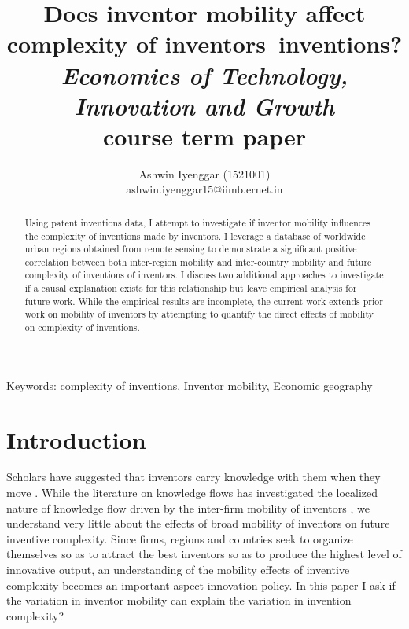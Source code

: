 \documentclass[12pt]{article}
\begin{document}
\title{\LARGE Does inventor mobility affect complexity of inventors\textquotesingle \ inventions?\\ \Large \textit{Economics of Technology, Innovation and Growth} \\course term paper}

\author{Ashwin Iyenggar  (1521001) \\ ashwin.iyenggar15@iimb.ernet.in} 
\large

\maketitle
\thispagestyle{empty}

\begin{abstract}
\large \noindent Using patent inventions data, I attempt to investigate if inventor mobility influences the complexity of inventions made by inventors. I leverage a database of worldwide urban regions  obtained from remote sensing to demonstrate a significant positive correlation between both inter-region mobility  and inter-country mobility and future complexity of inventions of inventors. I discuss two additional approaches to investigate if a causal explanation exists for this relationship but leave empirical analysis for future work. While the empirical results are incomplete, the current work extends prior work on mobility of inventors by attempting to quantify the direct effects of  mobility on complexity of inventions.
\end{abstract}
{Keywords:} complexity of inventions, Inventor mobility, Economic geography
\onehalfspacing
\section{Introduction}
Scholars have suggested that inventors carry knowledge with them when they move \citep{Almeida1999}. While the literature on knowledge flows has investigated the localized nature of knowledge flow driven by the inter-firm mobility of inventors \citep{Jaffe1993, Almeida1999, Alcacer2006a}, we understand very little about the effects of broad mobility of inventors on future inventive complexity. Since firms, regions and countries seek to organize themselves so as to attract the best inventors so as to produce the highest level of innovative output, an understanding of the mobility effects of inventive complexity becomes an important aspect innovation policy. In this paper I ask if  the variation in inventor mobility can explain the variation in invention complexity?
\end{document}
